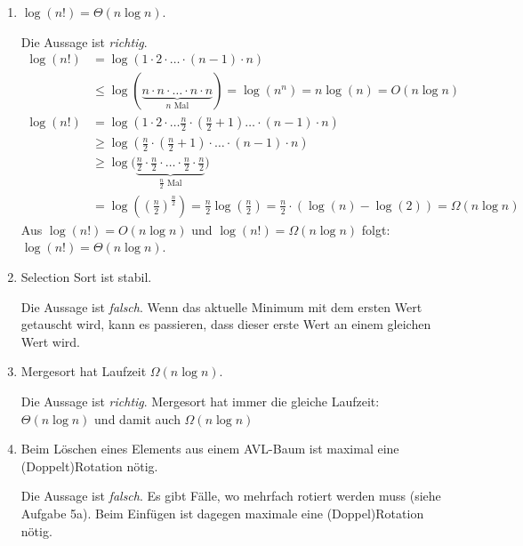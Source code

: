 \documentclass[11pt,a4paper]{article}
\begin{document}
\begin{loesung}
    \begin{enumerate}
        \item $\log(n!) = \Theta(n \log n)$.

        Die Aussage ist \emph{richtig}.
        \begin{align*}
            \log(n!) &= \log(1 \cdot 2 \cdot \ldots \cdot (n - 1) \cdot n) \\
            &\leq \log(\underbrace{n \cdot n \cdot \ldots \cdot n \cdot n}_{\text{$n$ Mal}}) 
            = \log(n^n) = n \log(n) = O(n\log n )
        \end{align*}
        \begin{align*}
            \log(n!) &= \log(1 \cdot 2 \cdot \ldots \frac{n}{2} \cdot \left(\frac{n}{2} + 1\right)\ldots \cdot (n - 1) \cdot n) \\
            &\geq \log\left(\frac{n}{2} \cdot \left(\frac{n}{2} + 1\right) \cdot \ldots \cdot (n - 1) \cdot n\right)  \\
            &\geq \log\Big(\underbrace{\frac{n}{2} \cdot \frac{n}{2} \cdot \ldots \cdot \frac{n}{2} \cdot \frac{n}{2}}_{\text{$\frac{n}{2}$ Mal}}\Big) \\
            &= \log\left(\left(\frac{n}{2}\right)^{\frac{n}{2}}\right)
            = \frac{n}{2} \log\left(\frac{n}{2}\right) 
            = \frac{n}{2} \cdot \left( \log(n) - \log(2) \right)
            = \Omega(n \log n )
        \end{align*}
        Aus $\log(n!) = O(n \log n)$ und $\log(n!) = \Omega(n \log n)$ folgt: $\log(n!) = \Theta(n \log n)$.
        \item Selection Sort ist stabil.

        Die Aussage ist \emph{falsch}.
        Wenn das aktuelle Minimum mit dem ersten Wert getauscht wird, kann es passieren, dass dieser erste Wert an einem gleichen Wert  wird.
        \item Mergesort hat Laufzeit $\Omega(n \log n)$.

        Die Aussage ist \emph{richtig}.
        Mergesort hat immer die gleiche Laufzeit: $\Theta(n \log n)$ und damit auch $\Omega(n \log n)$
        \item Beim Löschen eines Elements aus einem AVL-Baum ist maximal eine (Doppelt)Rotation nötig.

        Die Aussage ist \emph{falsch}.
        Es gibt Fälle, wo mehrfach rotiert werden muss (siehe Aufgabe 5a).
        Beim Einfügen ist dagegen maximale eine (Doppel)Rotation nötig.


\end{enumerate}
\end{loesung}
\end{document}
